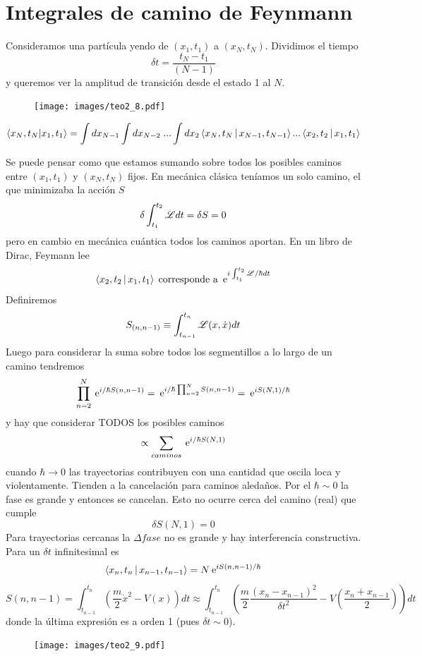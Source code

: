 \documentclass[10pt,oneside]{CBFT_book}
\begin{document}
\section{Integrales de camino de Feynmann}

Consideramos una partícula yendo de $(x_1,t_1)$ a $(x_N,t_N)$. Dividimos el tiempo 
\[
	\delta t = \frac{t_N-t_1}{(N-1)}
\]
y queremos ver la amplitud de transición desde el estado 1 al $N$.

\begin{figure}[htb]
	\begin{center}
	\texttt{[image: images/teo2\_8.pdf]}	 
	\end{center}
	\caption{}
\end{figure} 

\[
	\braket{x_N,t_N|x_1,t_1} = \int dx_{N-1}\int dx_{N-2} \; ...\int dx_2
	\Braket{x_N,t_N|x_{N-1},t_{N-1}} ...\Braket{x_2,t_2|x_1,t_1}
\]

Se puede pensar como que estamos sumando sobre todos los posibles caminos entre $(x_1,t_1)$ y $(x_N,t_N)$ 
fijos. En mecánica clásica teníamos un solo camino, el que minimizaba la acción $S$
\[
	\delta \int_{t_1}^{t_2} \mathscr{L} dt = \delta S = 0
\]
pero en cambio en mecánica cuántica todos los caminos aportan. En un libro de Dirac, Feymann lee 
\[
	\Braket{x_2,t_2|x_1,t_1} \; \text{corresponde a} \; \:\mathrm{e}^{i\int_{t_1}^{t_2}\mathscr{L}/\hbar dt}
\]
Definiremos
\[
	S_{(n,n-1)}\equiv \int_{t_{n-1}}^{t_n}\mathscr{L}(x,\dot{x}) dt
\]
Luego para considerar la suma sobre todos los segmentillos a lo largo de un camino tendremos
\[
	\prod_{n=2}^N \:\mathrm{e}^{i/\hbar S(n,n-1)} = \:\mathrm{e}^{i/\hbar \prod_{n=2}^N S(n,n-1)} = \:\mathrm{e}^{iS(N,1)/\hbar}
\]
y hay que considerar TODOS los posibles caminos 
\[
	\propto \sum_{caminos} \:\mathrm{e}^{i/\hbar S(N,1)} 
\]
cuando $\hbar \to 0$ las trayectorias contribuyen con una cantidad que oscila loca y violentamente. Tienden a 
la cancelación para caminos aledaños. Por el $\hbar \sim 0$ la fase es grande y entonces se cancelan.
Esto no ocurre cerca del camino (real) que cumple 
\[
	\delta S(N,1) = 0
\]
Para trayectorias cercanas la $\Delta fase$ no es grande y hay interferencia constructiva.
Para un $\delta t$ infinitesimal es 
\[
	\Braket{x_n,t_n|x_{n-1},t_{n-1}} = N \:\mathrm{e}^{iS(n,n-1)/\hbar}
\]
\[
	S(n,n-1) = \int_{t_{n-1}}^{t_n} \left( \frac{m}{2}\dot{x}^2 - V(x)\right) dt \approx
	\int_{t_{n-1}}^{t_n} \left( \frac{m}{2} \frac{(x_n-x_{n-1})^2}{\delta t^2} - 
	V\left(\frac{x_n+x_{n-1}}{2}\right)\right)  dt
\]
donde la última expresión es a orden 1 (pues $\delta t \sim 0$).
\begin{figure}[htb]
	\begin{center}
	\texttt{[image: images/teo2\_9.pdf]}
	\end{center}
	\caption{}
\end{figure} 
\end{document}
